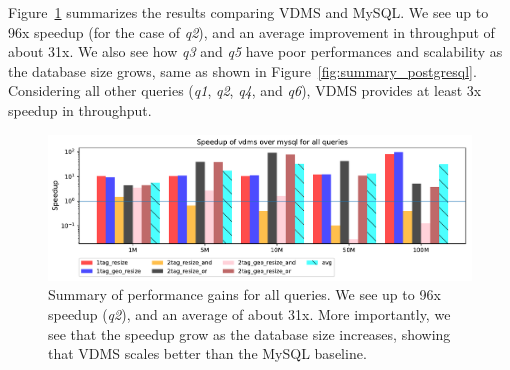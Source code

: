 Figure~\ref{fig:summary_mysql} summarizes the results
comparing VDMS and MySQL. We see up to 96x speedup (for the case of \textit{q2}),
and an average improvement in throughput of about 31x.
We also see how \textit{q3} and \textit{q5} have poor performances and scalability
as the database size grows, same as shown in Figure~\ref{fig:summary_postgresql}.
Considering all other queries (\textit{q1}, \textit{q2}, \textit{q4}, and \textit{q6}), 
VDMS provides at least 3x speedup in throughput.

\begin{figure}[ht]
\includegraphics[width=\textwidth]{figures/plot_th_56_query_times_speedup_mysql}
\caption{Summary of performance gains for all queries.
We see up to 96x speedup (\textit{q2}), and an average of about 31x.
More importantly, we see that the speedup grow as the database size increases,
showing that VDMS scales better than the MySQL baseline.}
\label{fig:summary_mysql}
\end{figure}
